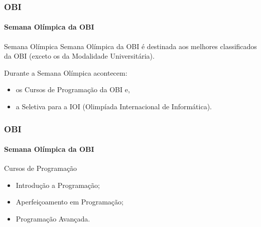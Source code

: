 \begin{frame}
	\frametitle{OBI}
	\framesubtitle{Semana Olímpica da OBI}
 
	\begin{block:concept}{Semana Olímpica}
		Semana Olímpica da OBI é destinada aos melhores classificados da OBI
		(exceto os da Modalidade Universitária).
	\end{block:concept}
	
	\begin{block:fact}{}
		Durante a Semana Olímpica acontecem:
		\begin{itemize}
			\item os Cursos de Programação da OBI e,
			\item a Seletiva para a IOI (Olimpíada Internacional de Informática).
		\end{itemize}
	\end{block:fact}
\end{frame}


\begin{frame}
	\frametitle{OBI}
	\framesubtitle{Semana Olímpica da OBI}

	\begin{block:concept}{Cursos de Programação}
		\begin{itemize}
			\item Introdução a Programação;
			\item Aperfeiçoamento em Programação;
			\item Programação Avançada.
		\end{itemize}
	\end{block:concept}
\end{frame}	
	
	
	
